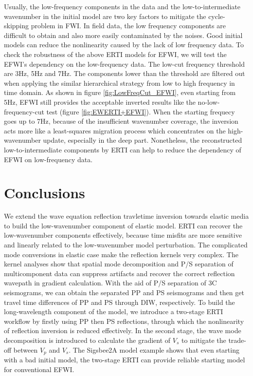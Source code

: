 Usually, the low-frequency components in the data and the low-to-intermediate wavenumber in the
initial model are two key factors to mitigate the cycle-skipping problem in FWI. In field data, the
low frequency components are difficult to obtain and also more easily contaminated by the noises.
Good initial models can reduce the nonlinearity caused by the lack of low frequency data.
To check the robustness of the above ERTI models for EFWI, we will test the EFWI's dependency on 
the low-frequency data.%
The low-cut frequency threshold are 3Hz,
5Hz and 7Hz. The components lower than the threshold are filtered out when applying the similar
hierarchical strategy from low to high frequency in time domain.
As shown in figure \ref{fig:LowFreqCut_EFWI}, even starting from 5Hz, EFWI still
provides the acceptable inverted results like
the no-low-frequency-cut test (figure \ref{fig:EWERTI+EFWI}). 
When the starting frequecy goes up to 7Hz, 
because of the insufficient wavenumber coverage, the inversion acts more like a least-squares migration process which concentrates on
the high-wavenumber update, especially in the deep part.
Nonetheless, the reconstructed low-to-intermediate components by ERTI can help to reduce the
dependency of EFWI on low-frequency data. 
\section{Conclusions}
We extend the wave equation reflection travletime inversion towards elastic media to build the
low-wavenumber
component of elastic model. 
ERTI can recover the low-wavenumber components effectively, because time misfits are more sensitive
and linearly related to the low-wavenumber model perturbation. 
The complicated mode conversions in elastic case make the reflection kernels very complex.
The kernel analyses show that spatial mode decomposition and P/S separation of
multicomponent data can suppress artifacts and recover the correct reflection wavepath in gradient calculation.
With the aid of 
P/S separation of 3C seismograms, we can obtain the separated PP and PS seismograms and then get
travel time differences of PP and PS through DIW, respectively. 
To build the long-wavelength component of the model, we introduce a two-stage ERTI
workflow by firstly using PP then PS reflections, through which the nonlinearity of reflection
inversion is reduced effectively. 
In the second stage, the wave mode
decomposition is introduced to calculate the gradient of $V_s$ to mitigate the trade-off between
$V_p$ and $V_s$.
The Sigsbee2A model example shows that even starting with a bad initial model, the
two-stage ERTI can provide reliable starting model for conventional EFWI. 

